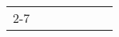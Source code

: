 \begin{table}[htbp!]
{\begin{tabular}{crcccrr}
    \cmidrule[1pt]{2-7}
    \end{tabular}
    
}
\end{table}
